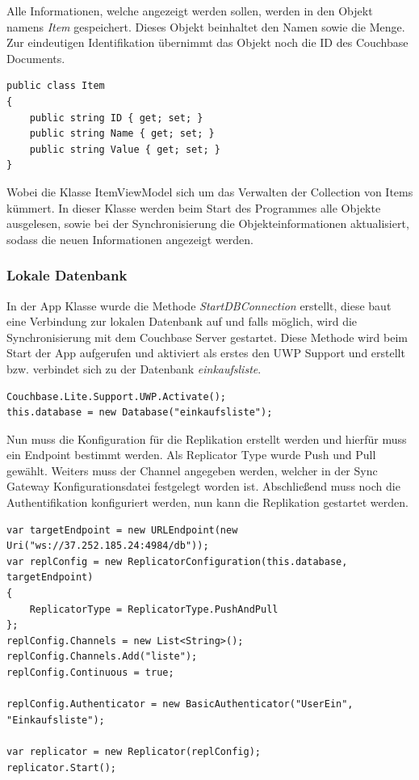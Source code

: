 Alle Informationen, welche angezeigt werden sollen, werden in den Objekt namens \textit{Item} gespeichert. Dieses Objekt beinhaltet den Namen sowie die Menge. Zur eindeutigen Identifikation übernimmt das Objekt noch die ID des Couchbase Documents.

\begin{verbatim}
public class Item
{
	public string ID { get; set; }
	public string Name { get; set; }
	public string Value { get; set; }
}
\end{verbatim}

Wobei die Klasse ItemViewModel sich um das Verwalten der Collection von Items kümmert. In dieser Klasse werden beim Start des Programmes alle Objekte ausgelesen, sowie bei der Synchronisierung die Objekteinformationen aktualisiert, sodass die neuen Informationen angezeigt werden. \cite{listview}

\subsubsection{Lokale Datenbank}

In der App Klasse wurde die Methode \textit{StartDBConnection} erstellt, diese baut eine Verbindung zur lokalen Datenbank auf und falls möglich, wird die Synchronisierung mit dem Couchbase Server gestartet. Diese Methode wird beim Start der App aufgerufen und aktiviert als erstes den UWP Support und erstellt bzw. verbindet sich zu der Datenbank \textit{einkaufsliste}.

\begin{verbatim}
Couchbase.Lite.Support.UWP.Activate();
this.database = new Database("einkaufsliste");
\end{verbatim}

Nun muss die Konfiguration für die Replikation erstellt werden und hierfür muss ein Endpoint bestimmt werden. Als Replicator Type wurde Push und Pull gewählt. Weiters muss der Channel angegeben werden, welcher in der Sync Gateway Konfigurationsdatei festgelegt worden ist. Abschließend muss noch die Authentifikation konfiguriert werden, nun kann die Replikation gestartet werden. \cite{couchbasegettingstarted}

\begin{verbatim}
var targetEndpoint = new URLEndpoint(new Uri("ws://37.252.185.24:4984/db"));
var replConfig = new ReplicatorConfiguration(this.database, targetEndpoint)
{
	ReplicatorType = ReplicatorType.PushAndPull
};
replConfig.Channels = new List<String>();
replConfig.Channels.Add("liste");
replConfig.Continuous = true;

replConfig.Authenticator = new BasicAuthenticator("UserEin", "Einkaufsliste");

var replicator = new Replicator(replConfig);
replicator.Start(); 
\end{verbatim}

